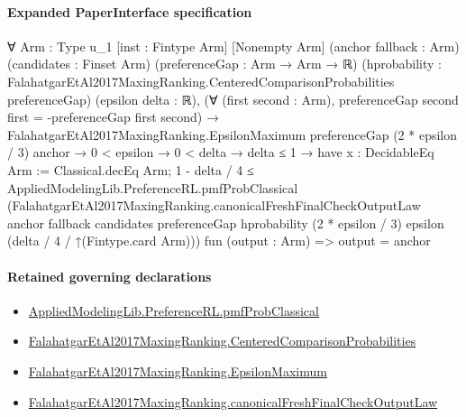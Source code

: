 \documentclass[10pt]{article}
\begin{document}
\paragraph{Expanded PaperInterface specification}
\begin{ReviewVerbatim}
∀ {Arm : Type u_1} [inst : Fintype Arm] [Nonempty Arm] (anchor fallback : Arm) (candidates : Finset Arm)
  (preferenceGap : Arm → Arm → ℝ)
  (hprobability : FalahatgarEtAl2017MaxingRanking.CenteredComparisonProbabilities preferenceGap) (epsilon delta : ℝ),
  (∀ (first second : Arm), preferenceGap second first = -preferenceGap first second) →
    FalahatgarEtAl2017MaxingRanking.EpsilonMaximum preferenceGap (2 * epsilon / 3) anchor →
      0 < epsilon →
        0 < delta →
          delta ≤ 1 →
            have x : DecidableEq Arm := Classical.decEq Arm;
            1 - delta / 4 ≤
              AppliedModelingLib.PreferenceRL.pmfProbClassical
                (FalahatgarEtAl2017MaxingRanking.canonicalFreshFinalCheckOutputLaw anchor fallback candidates
                  preferenceGap hprobability (2 * epsilon / 3) epsilon (delta / 4 / ↑(Fintype.card Arm)))
                fun (output : Arm) => output = anchor
\end{ReviewVerbatim}

\paragraph{Retained governing declarations}
\begin{itemize}\raggedright
\item \hyperlink{governing-declaration-7adb8ad5ca0d515c}{Applied\allowbreak{}Modeling\allowbreak{}Lib.\allowbreak{}Preference\allowbreak{}RL.\allowbreak{}pmf\allowbreak{}Prob\allowbreak{}Classical}
\item \hyperlink{paper-prerequisite-b99b697ef57f53ce}{Falahatgar\allowbreak{}Et\allowbreak{}Al2017\allowbreak{}Maxing\allowbreak{}Ranking.\allowbreak{}Centered\allowbreak{}Comparison\allowbreak{}Probabilities}
\item \hyperlink{paper-prerequisite-f40acf814741691d}{Falahatgar\allowbreak{}Et\allowbreak{}Al2017\allowbreak{}Maxing\allowbreak{}Ranking.\allowbreak{}Epsilon\allowbreak{}Maximum}
\item \hyperlink{governing-declaration-6f8a46fa91378263}{Falahatgar\allowbreak{}Et\allowbreak{}Al2017\allowbreak{}Maxing\allowbreak{}Ranking.\allowbreak{}canonical\allowbreak{}Fresh\allowbreak{}Final\allowbreak{}Check\allowbreak{}Output\allowbreak{}Law}
\end{itemize}
\end{document}

